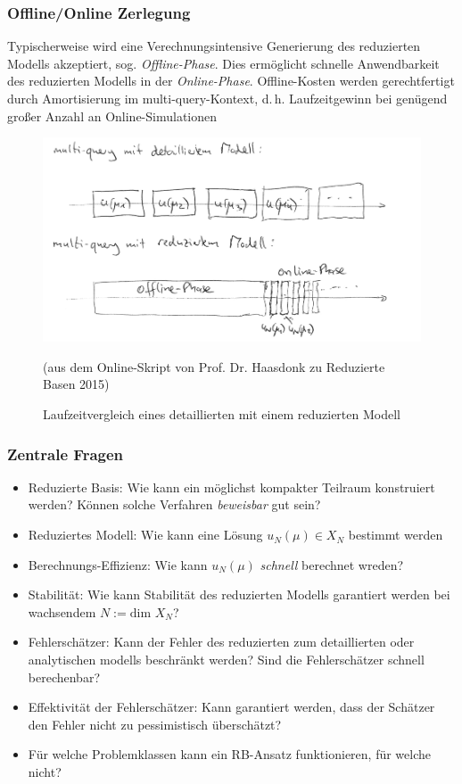 \subsubsection*{Offline/Online Zerlegung}
\label{Offline/Online Zerlegung}

Typischerweise wird eine Verechnungsintensive Generierung des reduzierten Modells akzeptiert, sog. \emph{Offline-Phase}. Dies ermöglicht schnelle Anwendbarkeit des reduzierten Modells in der \emph{Online-Phase}. Offline-Kosten werden gerechtfertigt durch Amortisierung im multi-query-Kontext, d.\,h. Laufzeitgewinn bei genügend großer Anzahl an Online-Simulationen

\begin{figure}[H]
  \centering\small
    \includegraphics[width = 0.6 \textwidth]{Bilder/OfflineOnline.png}
  \caption{Laufzeitvergleich eines detaillierten mit einem reduzierten Modell}{(aus dem Online-Skript von Prof. Dr. Haasdonk zu Reduzierte Basen 2015)}
  \label{fig:OfflineOnline}
\end{figure}

\subsubsection*{Zentrale Fragen}
\label{Zentrale Fragen}

\begin{itemize}
	\item Reduzierte Basis: Wie kann ein möglichst kompakter Teilraum konstruiert werden? Können solche Verfahren \emph{beweisbar} gut sein?
	\item Reduziertes Modell: Wie kann eine Lösung $u_N(\mu) \in X_N$ bestimmt werden
	\item Berechnungs-Effizienz: Wie kann $u_N(\mu)$ \emph{schnell} berechnet wreden?
	\item Stabilität: Wie kann Stabilität des reduzierten Modells garantiert werden bei wachsendem $N := \text{dim } X_N$?
	\item Fehlerschätzer: Kann der Fehler des reduzierten zum detaillierten oder analytischen modells beschränkt werden? Sind die Fehlerschätzer schnell berechenbar?
	\item Effektivität der Fehlerschätzer: Kann garantiert werden, dass der Schätzer den Fehler nicht zu pessimistisch überschätzt?
	\item Für welche Problemklassen kann ein RB-Ansatz funktionieren, für welche nicht?
\end{itemize}

